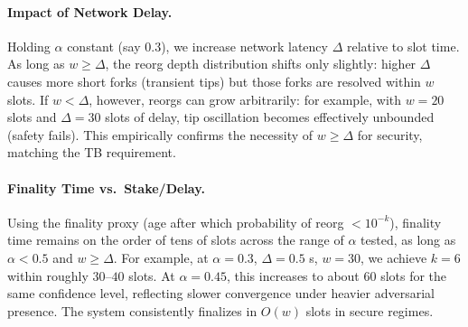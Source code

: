\paragraph{Impact of Network Delay.}
Holding $\alpha$ constant (say $0.3$), we increase network latency $\Delta$ relative to slot time. As long as $w \ge \Delta$, the reorg depth distribution shifts only slightly: higher $\Delta$ causes more short forks (transient tips) but those forks are resolved within $w$ slots. If $w < \Delta$, however, reorgs can grow arbitrarily: for example, with $w=20$ slots and $\Delta=30$ slots of delay, tip oscillation becomes effectively unbounded (safety fails). This empirically confirms the necessity of $w \ge \Delta$ for security, matching the TB requirement.

\paragraph{Finality Time vs.\ Stake/Delay.}
Using the finality proxy (age after which probability of reorg $<10^{-k}$), finality time remains on the order of tens of slots across the range of $\alpha$ tested, as long as $\alpha < 0.5$ and $w \ge \Delta$. For example, at $\alpha=0.3$, $\Delta=0.5$ s, $w=30$, we achieve $k=6$ within roughly $30$--$40$ slots. At $\alpha=0.45$, this increases to about $60$ slots for the same confidence level, reflecting slower convergence under heavier adversarial presence. The system consistently finalizes in $O(w)$ slots in secure regimes.

